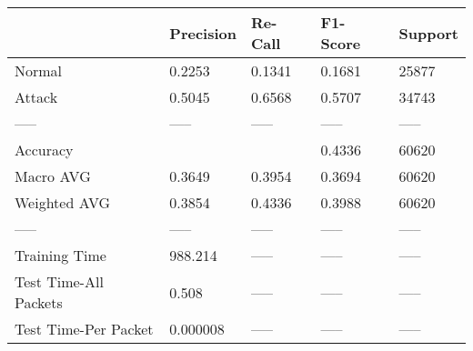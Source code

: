 \begin{tabular}{lllll}
\toprule
{} & Precision & Re-Call & F1-Score & Support \\
\midrule
Normal                &    0.2253 &  0.1341 &   0.1681 &   25877 \\
Attack                &    0.5045 &  0.6568 &   0.5707 &   34743 \\
-----                 &     ----- &   ----- &    ----- &   ----- \\
Accuracy              &           &         &   0.4336 &   60620 \\
Macro AVG             &    0.3649 &  0.3954 &   0.3694 &   60620 \\
Weighted AVG          &    0.3854 &  0.4336 &   0.3988 &   60620 \\
-----                 &     ----- &   ----- &    ----- &   ----- \\
Training Time         &   988.214 &   ----- &    ----- &   ----- \\
Test Time-All Packets &     0.508 &   ----- &    ----- &   ----- \\
Test Time-Per Packet  &  0.000008 &   ----- &    ----- &   ----- \\
\bottomrule
\end{tabular}
